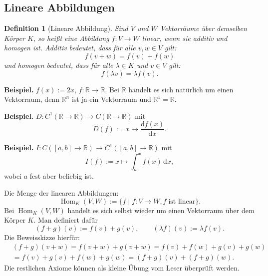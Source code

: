\documentclass[a4paper,11pt,fleqn,twoside]{scrartcl}
\numberwithin{equation}{section}
\newcommand{\R}{\mathbb R}
\newcommand{\strong}[1]{{\normalfont\sffamily\bfseries #1}}
\theoremstyle{rmbox}
\newtheorem{Definition}{Definition}
\begin{document}
\subsection{Lineare Abbildungen}

\begin{Definition}[Lineare Abbildung]
Sind $V$ und $W$ Vektorräume über demselben Körper $K$, so heißt
eine Abbildung $f\colon V\to W$ \emph{linear}, wenn sie additiv
und homogen ist. \emph{Additiv} bedeutet, dass für alle $v,w\in V$
gilt:
\begin{equation}
f(v+w) = f(v)+f(w)
\end{equation}
und \emph{homogen} bedeutet, dass für alle $\lambda\in K$ und $v\in V$
gilt:
\begin{equation}
f(\lambda v) = \lambda f(v).
\end{equation}
\end{Definition}

\strong{Beispiel.} $f(x):=2x$, $f\colon\R\to\R$. Bei $\R$ handelt
es sich natürlich um einen Vektorraum, denn $\R^n$ ist ja ein
Vektorraum und $\R^1=\R$.

\strong{Beispiel.} $D\colon C^1(\R\to\R)\to C(\R\to\R)$ mit
\begin{equation}
D(f):=x\mapsto\frac{\mathrm df(x)}{\mathrm dx}.
\end{equation}

\strong{Beispiel.} $I\colon C([a,b]\to\R)\to C^1([a,b]\to\R)$ mit
\begin{equation}
I(f):=x\mapsto\int_a^x f(x)\,\mathrm dx,
\end{equation}
wobei $a$ fest aber beliebig ist.

Die Menge der linearen Abbildungen:
\begin{equation}
\operatorname{Hom}_K(V,W)
:= \{f\mid f\colon V\to W, f\;\text{ist linear}\}.
\end{equation}
Bei $\operatorname{Hom}_K(V,W)$ handelt es sich selbst wieder
um einen Vektorraum über dem Körper $K$. Man definiert dafür
\begin{equation}
(f+g)(v) := f(v)+g(v),\qquad
(\lambda f)(v) := \lambda f(v).
\end{equation}
Die Beweisskizze hierfür:
\[\begin{split}
&(f+g)(v+w) = f(v+w)+g(v+w) = f(v)+f(w)+g(v)+g(w)\\
&= f(v)+g(v)+f(w)+g(w) = (f+g)(v)+(f+g)(w).
\end{split}\]
Die restlichen Axiome können als kleine Übung vom Leser
überprüft werden.
\end{document}
